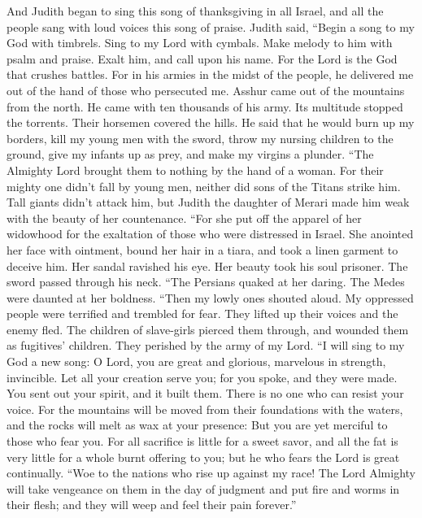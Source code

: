  And Judith began to sing this song of thanksgiving in all
Israel, and all the people sang with loud voices this song of praise.
 Judith said, ``Begin a song to my God with timbrels. Sing
to my Lord with cymbals. Make melody to him with psalm and praise. Exalt
him, and call upon his name.  For the Lord is the God that
crushes battles. For in his armies in the midst of the people, he
delivered me out of the hand of those who persecuted me. 
Asshur came out of the mountains from the north. He came with ten
thousands of his army. Its multitude stopped the torrents. Their
horsemen covered the hills.  He said that he would burn up
my borders, kill my young men with the sword, throw my nursing children
to the ground, give my infants up as prey, and make my virgins a
plunder.  ``The Almighty Lord brought them to nothing by
the hand of a woman.  For their mighty one didn't fall by
young men, neither did sons of the Titans strike him. Tall giants didn't
attack him, but Judith the daughter of Merari made him weak with the
beauty of her countenance.  ``For she put off the apparel
of her widowhood for the exaltation of those who were distressed in
Israel. She anointed her face with ointment, bound her hair in a tiara,
and took a linen garment to deceive him.  Her sandal
ravished his eye. Her beauty took his soul prisoner. The sword passed
through his neck.  ``The Persians quaked at her daring.
The Medes were daunted at her boldness.  ``Then my lowly
ones shouted aloud. My oppressed people were terrified and trembled for
fear. They lifted up their voices and the enemy fled. 
The children of slave-girls pierced them through, and wounded them as
fugitives' children. They perished by the army of my Lord.
 ``I will sing to my God a new song: O Lord, you are
great and glorious, marvelous in strength, invincible. 
Let all your creation serve you; for you spoke, and they were made. You
sent out your spirit, and it built them. There is no one who can resist
your voice.  For the mountains will be moved from their
foundations with the waters, and the rocks will melt as wax at your
presence: But you are yet merciful to those who fear you.
 For all sacrifice is little for a sweet savor, and all
the fat is very little for a whole burnt offering to you; but he who
fears the Lord is great continually.  ``Woe to the
nations who rise up against my race! The Lord Almighty will take
vengeance on them in the day of judgment and put fire and worms in their
flesh; and they will weep and feel their pain forever.''

